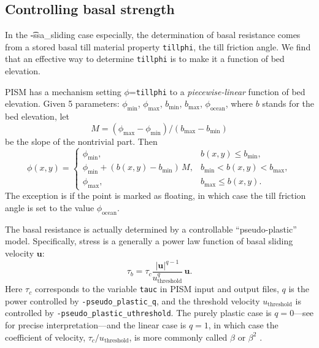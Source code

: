 \subsection{Controlling basal strength}  \label{subsect:basestrength}

In the \t{-ssa_sliding} case especially, the determination of basal resistance comes from a stored basal till material property \texttt{tillphi}, the till friction angle.  We find that an effective way to determine \texttt{tillphi} is to make it a function of bed elevation.

PISM has a mechanism setting $\phi$=\texttt{tillphi} to a \emph{piecewise-linear} function of bed elevation.  Given 5 parameters: $\phi_{\mathrm{min}}$, $\phi_{\mathrm{max}}$, $b_{\mathrm{min}}$, $b_{\mathrm{max}}$, $\phi_{\mathrm{ocean}}$, where $b$ stands for the bed elevation, let 
\begin{equation}
  M = (\phi_{\text{max}} - \phi_{\text{min}}) / (b_{\text{max}} - b_{\text{min}})\label{eq:1}
\end{equation}
be the slope of the nontrivial part.  Then
\begin{equation}
  \phi(x,y) = \begin{cases}
    \phi_{\text{min}}, & b(x,y) \le b_{\text{min}}, \\
    \phi_{\text{min}} + (b(x,y) - b_{\text{min}}) \,M,
    &  b_{\text{min}} < b(x,y) < b_{\text{max}}, \\
    \phi_{\text{max}}, & b_{\text{max}} \le b(x,y). \end{cases}\label{eq:2}
\end{equation}
The exception is if the point is marked as floating, in which case the till friction angle
is set to the value $\phi_{\mathrm{ocean}}$.

The basal resistance is actually determined by a controllable ``pseudo-plastic'' model.  Specifically, stress is a generally a power law function of basal sliding velocity $\mathbf{u}$:
   $$\tau_b = \tau_c \frac{|\mathbf{u}|^{q-1}}{u_{\text{threshold}}^q}\, \mathbf{u}.$$
Here $\tau_c$ corresponds to the variable \texttt{tauc} in PISM input and output files, $q$ is the power controlled by \texttt{-pseudo_plastic_q}, and the threshold velocity $u_{\text{threshold}}$ is controlled by \texttt{-pseudo_plastic_uthreshold}.  The purely plastic case is $q=0$---see \cite{SchoofStream} for precise interpretation---and the linear case is $q=1$, in which case the coefficient of velocity, $\tau_c/u_{\text{threshold}}$, is more commonly called $\beta$ or $\beta^2$ \cite{MacAyeal}.

